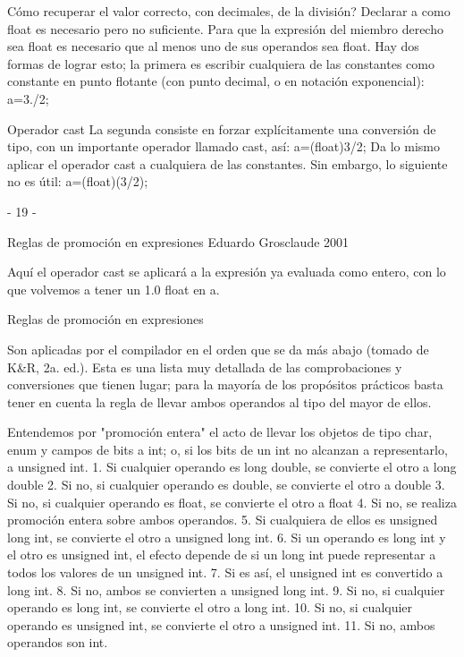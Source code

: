 Cómo recuperar el valor correcto, con decimales, de la división? Declarar a como float es necesario
pero no suficiente. Para que la expresión del miembro derecho sea float es necesario que al menos uno
de sus operandos sea float. Hay dos formas de lograr esto; la primera es escribir cualquiera de las
constantes como constante en punto flotante (con punto decimal, o en notación exponencial):
a=3./2;

Operador cast
La segunda consiste en forzar explícitamente una conversión de tipo, con un importante operador
llamado cast, así:
a=(float)3/2;
Da lo mismo aplicar el operador cast a cualquiera de las constantes. Sin embargo, lo siguiente no es
útil:
a=(float)(3/2);

- 19 -

Reglas de promoción en expresiones
Eduardo Grosclaude 2001

Aquí el operador cast se aplicará a la expresión ya evaluada como entero, con lo que volvemos a tener
un 1.0 float en a.

Reglas de promoción en expresiones

Son aplicadas por el compilador en el orden que se da más abajo (tomado de K&R, 2a. ed.). Esta es
una lista muy detallada de las comprobaciones y conversiones que tienen lugar; para la mayoría de los
propósitos prácticos basta tener en cuenta la regla de llevar ambos operandos al tipo del mayor de
ellos.

Entendemos por "promoción entera" el acto de llevar los objetos de tipo char, enum y campos de bits a
int; o, si los bits de un int no alcanzan a representarlo, a unsigned int.
1. Si cualquier operando es long double, se convierte el otro a long double
2. Si no, si cualquier operando es double, se convierte el otro a double
3. Si no, si cualquier operando es float, se convierte el otro a float
4. Si no, se realiza promoción entera sobre ambos operandos.
5. Si cualquiera de ellos es unsigned long int, se convierte el otro a unsigned long int.
6. Si un operando es long int y el otro es unsigned int, el efecto depende de si un long int puede
representar a todos los valores de un unsigned int.
7. Si es así, el unsigned int es convertido a long int.
8. Si no, ambos se convierten a unsigned long int.
9. Si no, si cualquier operando es long int, se convierte el otro a long int.
10. Si no, si cualquier operando es unsigned int, se convierte el otro a unsigned int.
11. Si no, ambos operandos son int.

